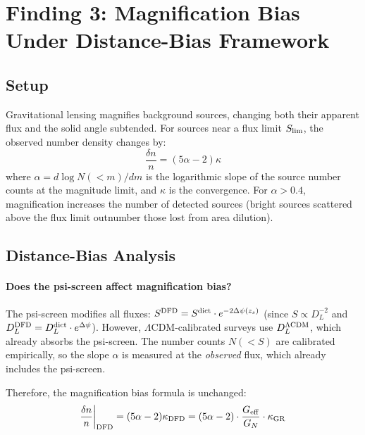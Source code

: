 \documentclass[11pt,a4paper]{article}
\newcommand{\LCDM}{$\Lambda$CDM}
\newcommand{\Geff}{G_{\rm eff}}
\newcommand{\Dpsi}{\Delta\psi}
\begin{document}
\section{Finding 3: Magnification Bias Under Distance-Bias Framework}
\label{sec:magnification-bias}

\subsection{Setup}

Gravitational lensing magnifies background sources, changing both their
apparent flux and the solid angle subtended.  For sources near a
flux limit $S_{\rm lim}$, the observed number density changes by:
\begin{equation}
\frac{\delta n}{n} = (5\alpha - 2)\kappa
\end{equation}
where $\alpha = d\log N(<m)/dm$ is the logarithmic slope of the
source number counts at the magnitude limit, and $\kappa$ is the
convergence.  For $\alpha > 0.4$, magnification increases the number
of detected sources (bright sources scattered above the flux limit
outnumber those lost from area dilution).

\subsection{Distance-Bias Analysis}

\paragraph{Does the psi-screen affect magnification bias?}

The psi-screen modifies all fluxes: $S^{\rm DFD} = S^{\rm dict}
\cdot e^{-2\Dpsi(z_s)}$ (since $S \propto D_L^{-2}$ and
$D_L^{\rm DFD} = D_L^{\rm dict} \cdot e^{\Dpsi}$).  However,
\LCDM-calibrated surveys use $D_L^{\rm \Lambda CDM}$, which already
absorbs the psi-screen.  The number counts $N(<S)$ are calibrated
empirically, so the slope $\alpha$ is measured at the \emph{observed}
flux, which already includes the psi-screen.

Therefore, the magnification bias formula is unchanged:
\begin{equation}
\frac{\delta n}{n}\bigg|_{\rm DFD} = (5\alpha - 2)\kappa_{\rm DFD}
= (5\alpha - 2) \cdot \frac{\Geff}{G_N} \cdot \kappa_{\rm GR}
\end{equation}
\end{document}
